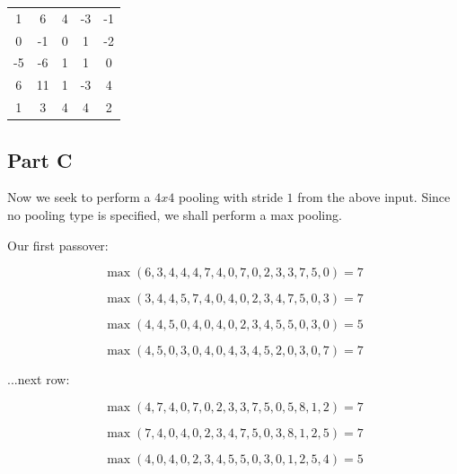 \documentclass{article}
\begin{document}
\begin{center}
    \begin{tabular}{c c c c c}
        1 & 6 & 4 & -3 & -1 \\
        0 & -1 & 0 & 1 & -2 \\
        -5 & -6 & 1 & 1 & 0 \\
        6 & 11 & 1 & -3 & 4 \\
        1 & 3 & 4 & 4 & 2 \\
    \end{tabular}
\end{center}

\subsection*{Part C}

Now we seek to perform a $4x4$ pooling with stride $1$ from the above input. Since no pooling type is specified, we shall perform a max pooling.

\noindent Our first passover:

\begin{equation}
    \max(6, 3, 4, 4, 4, 7, 4, 0, 7, 0, 2, 3, 3, 7, 5, 0) = 7
\end{equation}

\begin{equation}
    \max(3, 4, 4, 5, 7, 4, 0, 4, 0, 2, 3, 4, 7, 5, 0, 3) = 7
\end{equation}

\begin{equation}
    \max(4, 4, 5, 0, 4, 0, 4, 0, 2, 3, 4, 5, 5, 0, 3, 0) = 5
\end{equation}

\begin{equation}
    \max(4, 5, 0, 3, 0, 4, 0, 4, 3, 4, 5, 2, 0, 3, 0, 7) = 7
\end{equation}

\noindent ...next row:

\begin{equation}
    \max(4, 7, 4, 0, 7, 0, 2, 3, 3, 7, 5, 0, 5, 8, 1, 2) = 7
\end{equation}

\begin{equation}
    \max(7, 4, 0, 4 , 0, 2, 3, 4, 7, 5, 0, 3, 8, 1, 2, 5) = 7
\end{equation}

\begin{equation}
    \max(4, 0, 4, 0, 2, 3, 4, 5, 5, 0, 3, 0, 1, 2, 5, 4) = 5
\end{equation}
\end{document}
